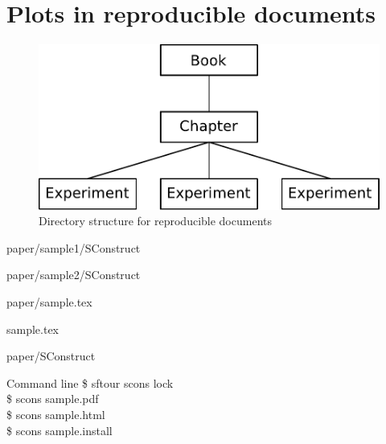 \section{Plots in reproducible documents}

\begin{frame}
  \begin{figure}
  \includegraphics[scale=0.55]{Fig/pstruct.pdf}
  \caption{Directory structure for reproducible documents}
  \end{figure}
\end{frame}

\begin{frame}
  \begin{block}{paper/sample1/SConstruct}
  
  \end{block}
  \begin{block}{paper/sample2/SConstruct}
  
  \end{block}
\end{frame}

\begin{frame}
  \begin{block}{paper/sample.tex}
  
                   {sample.tex}
  \end{block}
\end{frame}

\begin{frame}
  \begin{block}{paper/SConstruct}
  
%  
  \end{block}
  \begin{block}{Command line}
    \$ sftour scons lock \\
    \$ scons sample.pdf \\
    \$ scons sample.html \\
    \$ scons sample.install
  \end{block}
\end{frame}

